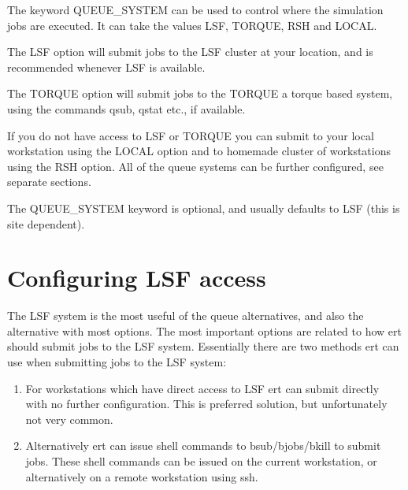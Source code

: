 \documentclass[letterpaper,10pt,english]{sphinxmanual}
\begin{document}
\begin{sphinxShadowBox}

The keyword QUEUE\_SYSTEM can be used to control where the simulation jobs are
executed. It can take the values LSF, TORQUE, RSH and LOCAL.

The LSF option will submit jobs to the LSF cluster at your location, and is
recommended whenever LSF is available.

The TORQUE option will submit jobs to the TORQUE a torque based system, using
the commands qsub, qstat etc., if available.

If you do not have access to LSF or TORQUE you can submit to your local
workstation using the LOCAL option and to homemade cluster of workstations
using the RSH option. All of the queue systems can be further configured, see
separate sections.


%
\begin{sphinxVerbatim}[commandchars=\\\{\}]
       
 
\end{sphinxVerbatim}

The QUEUE\_SYSTEM keyword is optional, and usually defaults to LSF (this is
site dependent).
\end{sphinxShadowBox}


\section{Configuring LSF access}
\label{\detokenize{keywords/index:configuring-lsf-access}}\label{\detokenize{keywords/index:id13}}
The LSF system is the most useful of the queue alternatives, and also the
alternative with most options. The most important options are related to how ert
should submit jobs to the LSF system. Essentially there are two methods ert can
use when submitting jobs to the LSF system:
\begin{enumerate}
\item {} 
For workstations which have direct access to LSF ert can submit directly with
no further configuration. This is preferred solution, but unfortunately not
very common.

\item {} 
Alternatively ert can issue shell commands to bsub/bjobs/bkill to submit
jobs. These shell commands can be issued on the current workstation, or
alternatively on a remote workstation using ssh.

\end{enumerate}
\end{document}
